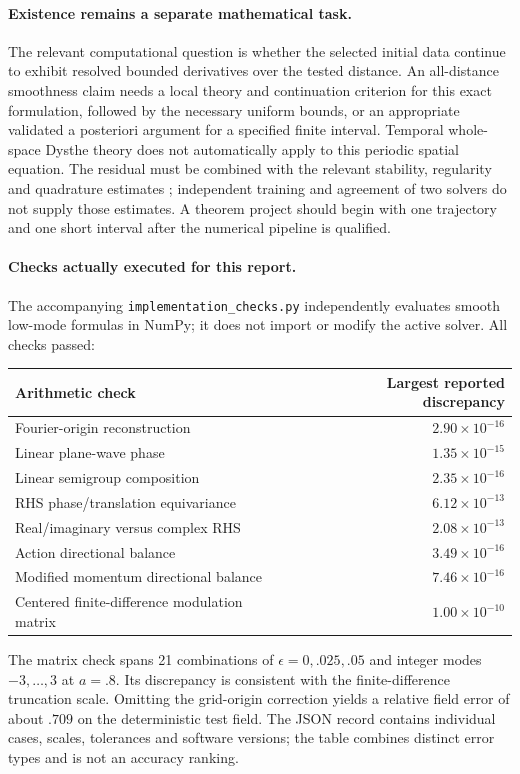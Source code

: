 \paragraph{Existence remains a separate mathematical task.}
The relevant computational question is whether the selected initial
data continue to exhibit resolved bounded derivatives over the tested
distance. An all-distance smoothness claim needs a local theory and
continuation criterion for this exact formulation, followed by the
necessary uniform bounds, or an appropriate validated a posteriori
argument for a specified finite interval. Temporal whole-space Dysthe
theory \cite{mps} does not automatically apply to this periodic spatial
equation. The residual must be combined with the relevant stability,
regularity and quadrature estimates \cite{mishra}; independent training
and agreement of two solvers do not supply those estimates.
A theorem project should begin with one trajectory and one short
interval after the numerical pipeline is qualified.

\paragraph{Checks actually executed for this report.}
The accompanying \texttt{implementation\_checks.py} independently
evaluates smooth low-mode formulas in NumPy; it does not import or modify
the active solver. All checks passed:
\begin{center}
\small
\begin{tabular}{lr}
\toprule
Arithmetic check & Largest reported discrepancy\\
\midrule
Fourier-origin reconstruction & $2.90\times10^{-16}$\\
Linear plane-wave phase & $1.35\times10^{-15}$\\
Linear semigroup composition & $2.35\times10^{-16}$\\
RHS phase/translation equivariance & $6.12\times10^{-13}$\\
Real/imaginary versus complex RHS & $2.08\times10^{-13}$\\
Action directional balance & $3.49\times10^{-16}$\\
Modified momentum directional balance & $7.46\times10^{-16}$\\
Centered finite-difference modulation matrix & $1.00\times10^{-10}$\\
\bottomrule
\end{tabular}
\end{center}
The matrix check spans 21 combinations of $\epsilon=0,.025,.05$ and
integer modes $-3,\ldots,3$ at $a=.8$. Its discrepancy is consistent
with the finite-difference truncation scale. Omitting the grid-origin
correction yields a relative field error of about $.709$ on the
deterministic test field. The JSON record contains individual cases,
scales, tolerances and software versions; the table combines distinct
error types and is not an accuracy ranking.

